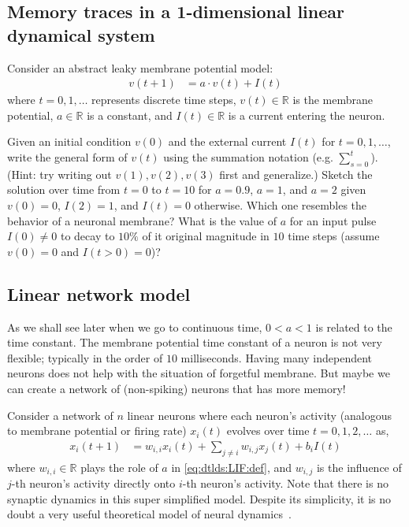 \documentclass[a4paper,11pt]{exam}
\newcounter{ct}
\newcommand{\field}[1]{\ensuremath{\mathbb{#1}}}
\newcommand{\reals}{\field{R}}
\begin{document}
\subsection{Memory traces in a 1-dimensional linear dynamical system}
Consider an abstract leaky membrane potential model:
\begin{align}\label{eq:dtlds:LIF:def}
	v(t+1) &= a \cdot v(t) + I(t)
\end{align}
where $t = 0, 1, \ldots $ represents discrete time steps, $v(t) \in \reals$ is the membrane potential, $a \in \reals$ is a constant, and $I(t) \in \reals$ is a current entering the neuron.

\begin{questions}
\question Given an initial condition $v(0)$ and the external current $I(t)$ for $t = 0, 1, \ldots $, write the general form of $v(t)$ using the summation notation (e.g. $\sum_{s=0}^t$). (Hint: try writing out $v(1), v(2), v(3)$ first and generalize.)
\question Sketch the solution over time from $t=0$ to $t=10$ for $a = 0.9$, $a = 1$, and $a = 2$ given $v(0) = 0$, $I(2) = 1$, and $I(t) = 0$ otherwise. Which one resembles the behavior of a neuronal membrane?
\question What is the value of $a$ for an input pulse $I(0) \neq 0$ to decay to $10\%$ of it original magnitude in $10$ time steps (assume $v(0) = 0$ and $I(t > 0) = 0$)?

\newpage
\subsection{Linear network model}
As we shall see later when we go to continuous time, $0 < a < 1$ is related to the time constant.
The membrane potential time constant of a neuron is not very flexible; typically in the order of $10$ milliseconds.
Having many independent neurons does not help with the situation of forgetful membrane.
But maybe we can create a network of (non-spiking) neurons that has more memory!

Consider a network of $n$ linear neurons where each neuron's activity (analogous to membrane potential or firing rate) $x_i(t)$ evolves over time $t = 0, 1, 2, \ldots$ as,
\begin{align}\label{eq:dtlds:LDS}
	x_i(t+1) &= w_{i,i} x_i(t) + \sum_{j \neq i} w_{i,j} x_j(t) + b_i I(t)
\end{align}
where $w_{i,i} \in \reals$ plays the role of $a$ in \eqref{eq:dtlds:LIF:def}, and $w_{i,j}$ is the influence of $j$-th neuron's activity directly onto $i$-th neuron's activity.
Note that there is no synaptic dynamics in this super simplified model.
Despite its simplicity, it is no doubt a very useful theoretical model of neural dynamics~\citep{Druckmann2012,Ganguli2008,Goldman2009}.


\end{questions}
\end{document}
